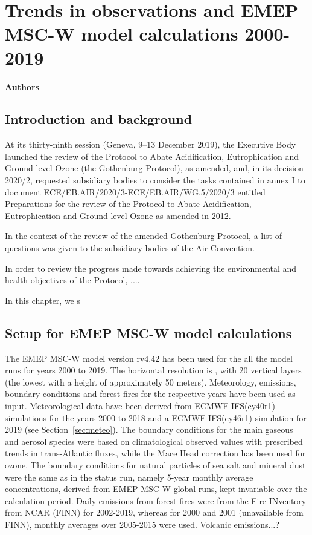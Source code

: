 \chapter[Trends]{Trends in observations and EMEP MSC-W model calculations 2000-2019}
\label{ch:Trends}

{\bf{Authors}}\\


\section{\label{sec:Trends_introduction}Introduction and background}
At its thirty-ninth session (Geneva, 9–13 December 2019), the Executive Body launched the review of the Protocol to Abate Acidification, Eutrophication and Ground-level Ozone (the Gothenburg Protocol), as amended, and, in its decision 2020/2, requested subsidiary bodies to consider the tasks contained in annex I to document ECE/EB.AIR/2020/3-ECE/EB.AIR/WG.5/2020/3 entitled Preparations for the review of the Protocol to Abate Acidification, Eutrophication and Ground-level Ozone as amended in 2012.

In the context of the review of the amended Gothenburg Protocol, a list of questions was given to the subsidiary bodies of the Air Convention.

In order to review the progress made towards achieving the environmental and health objectives of the Protocol, ....

In this chapter, we s


\section{\label{EMEPmodelcalc}{Setup for EMEP MSC-W model calculations}}
The EMEP MSC-W model version rv4.42 has been used for the all the model runs for years 2000 to 2019. The horizontal resolution is \resZO, with 20 vertical layers (the lowest with a height of approximately 50 meters).
 Meteorology, emissions, boundary conditions and forest fires for the respective years have been used as input. Meteorological data have been
 derived from ECMWF-IFS(cy40r1) simulations for the years 2000 to 2018 and a ECMWF-IFS(cy46r1) simulation for 2019 (see Section~\ref{sec:meteo}). 
 The boundary conditions for the main gaseous and aerosol species were based on climatological observed values with prescribed trends in trans-Atlantic fluxes, while the Mace
Head correction has been used for ozone. The boundary conditions for natural particles of
sea salt and mineral dust were the same as in the status run, namely 5-year monthly average
concentrations, derived from EMEP MSC-W global runs, kept invariable over the calculation
period.
Daily emissions from forest fires were from the Fire INventory from NCAR (FINN) for 2002-2019,
whereas for 2000 and 2001 (unavailable from FINN), monthly averages over 2005-2015 were
used.
 Volcanic emissions...?
 

